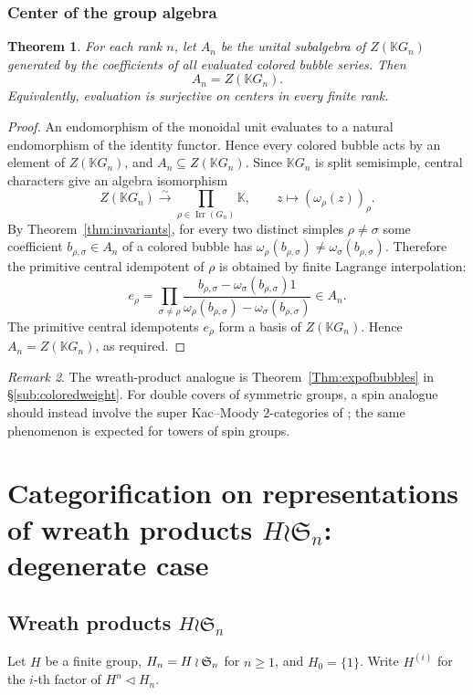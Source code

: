 \documentclass[12pt]{amsart}
\numberwithin{itemcounter}{subsection}
\theoremstyle{plain}
\newtheorem{theorem}{Theorem}[section]
\theoremstyle{definition}
\theoremstyle{remark}
\newtheorem{remark}[theorem]{Remark}
\numberwithin{equation}{section}
\def\bbK{\mathbb{K}}
\def\frakS{\mathfrak{S}}
\def\Irr{{\operatorname{Irr}\nolimits}}
\begin{document}
\subsubsection{Center of the group algebra}\label{subsec:center}
\begin{theorem}\label{Thm:centersurjective}
For each rank \(n\), let
\(A_n\) be the unital subalgebra of \(Z(\bbK G_n)\) generated by the
coefficients of all evaluated colored bubble series.  Then
\[
A_n=Z(\bbK G_n).
\]
Equivalently, evaluation is surjective on centers in every finite rank.
\end{theorem}
\begin{proof}
An endomorphism of the monoidal unit evaluates to a natural endomorphism of
the identity functor.  Hence every colored bubble acts by an element of
\(Z(\bbK G_n)\), and \(A_n\subseteq Z(\bbK G_n)\).  Since \(\bbK G_n\) is split semisimple, central characters give an
algebra isomorphism
\[
Z(\bbK G_n)\xrightarrow{\sim}
\prod_{\rho\in\Irr(G_n)}\bbK,
\qquad
z\longmapsto(\omega_\rho(z))_\rho.
\]
By Theorem~\ref{thm:invariants}, for every two distinct simples
\(\rho\ne\sigma\) some coefficient \(b_{\rho,\sigma}\in A_n\) of a colored
bubble has
\(\omega_\rho(b_{\rho,\sigma})\ne
\omega_\sigma(b_{\rho,\sigma})\).  Therefore the primitive central idempotent
of \(\rho\) is obtained by finite Lagrange interpolation:
\[
e_\rho=
\prod_{\sigma\ne\rho}
\frac{b_{\rho,\sigma}-
      \omega_\sigma(b_{\rho,\sigma})1}
     {\omega_\rho(b_{\rho,\sigma})-
      \omega_\sigma(b_{\rho,\sigma})}
\in A_n.
\]
The primitive central idempotents \(e_\rho\) form a basis of
\(Z(\bbK G_n)\).  Hence \(A_n=Z(\bbK G_n)\), as required.
\end{proof}

\begin{remark}\label{Rem:computebubbles}
The wreath-product analogue is Theorem~\ref{Thm:expofbubbles} in
\S\ref{sub:coloredweight}.  For double covers of symmetric groups, a spin
analogue should instead involve the super Kac--Moody $2$-categories of
\cite{BE17}; the same phenomenon is expected for towers of spin groups.
\end{remark}

\section{Categorification on representations of wreath products $ H \wr \frakS_n$: degenerate case}
\label{sec:degenerate}
\subsection{Wreath products $ H \wr \frakS_n$}
Let $H$ be a finite group, $H_n=H\wr\frak S_n$ for $n\geq1$, and
$H_0=\{1\}$.  Write $H^{(i)}$ for the $i$-th factor of
$H^n\triangleleft H_n$.
\end{document}
